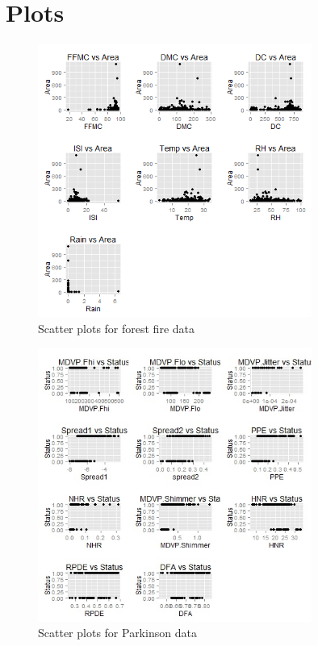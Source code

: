 \documentclass{article}
\begin{document}
\appendix

\section{Plots}
\begin{figure}[h]
  \centering
  \includegraphics[width=0.8\textwidth]{forestfire.jpg}
  \caption{Scatter plots for forest fire data}
  \label{fig:fire_scatters}
\end{figure}

\pagebreak

\begin{figure}[h]
  \centering
  \includegraphics[width=0.8\textwidth]{parkinson.jpg}
  \caption{Scatter plots for Parkinson data}
  \label{fig:parkinson_scatters}
\end{figure}
\end{document}
